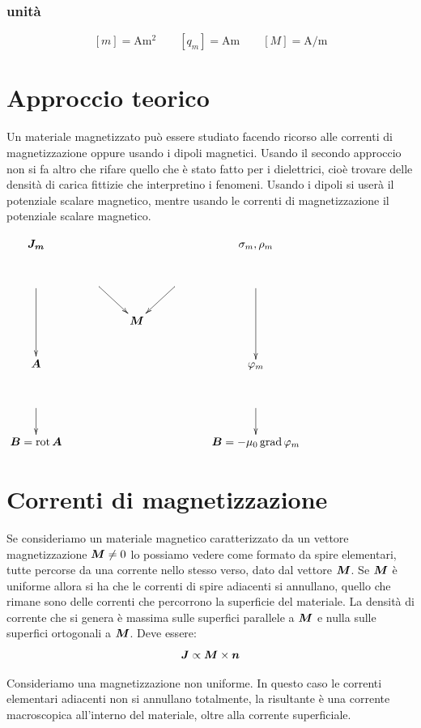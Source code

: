 \subsubsection{unità}
\[
  \left[m\right]=\si{\ampere\meter\squared}
  \qquad
  \left[q_m\right]=\si{\ampere\meter}
  \qquad
  \left[M\right]=\si{\ampere\per\meter}
\]
\section{Approccio teorico}
Un materiale magnetizzato può essere studiato facendo ricorso alle correnti di magnetizzazione oppure usando i dipoli magnetici. Usando il secondo approccio non si fa altro che rifare quello che è stato fatto per i dielettrici, cioè trovare delle densità di carica fittizie che interpretino i fenomeni. Usando i dipoli si userà il potenziale scalare magnetico, mentre usando le correnti di magnetizzazione il potenziale scalare magnetico.
\begin{center}
  $
    \xymatrix{
      \ve{J_m}&&&&\sigma_m,\rho_m\\
      \ar[dd]&\ar[dr]&&\ar[dl]&\ar[dd]\\
      &&\ve M&&\\
      \ve A&&&&\varphi_m\\
      \ar[d]&&&&\ar[d]\\
      \ve B=\rot\ve A&&&&\ve B=-\mu_0\grad\varphi_m
    }$\end{center}
\section{Correnti di magnetizzazione}
Se consideriamo un materiale magnetico caratterizzato da un vettore magnetizzazione $\boldsymbol{M}\neq 0$ lo possiamo vedere come formato da spire elementari, tutte percorse da una corrente nello stesso verso, dato dal vettore $\boldsymbol{M}$. Se $\boldsymbol{M}$ è uniforme allora si ha che le correnti di spire adiacenti si annullano, quello che rimane sono delle correnti che percorrono la superficie del materiale. La densità di corrente che si genera è massima sulle superfici parallele a $\boldsymbol{M}$ e nulla sulle superfici ortogonali a $\boldsymbol{M}$. Deve essere:
\[
  \boldsymbol{J}\propto \boldsymbol{M}\times\boldsymbol{n}
\]

Consideriamo una magnetizzazione non uniforme. In questo caso le correnti elementari adiacenti non si annullano totalmente, la risultante è una corrente macroscopica all'interno del materiale, oltre alla corrente superficiale.

